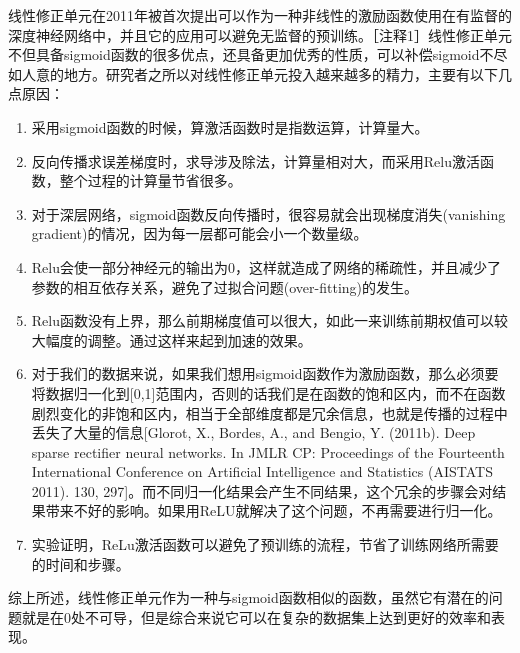 		线性修正单元在2011年被首次提出可以作为一种非线性的激励函数使用在有监督的深度神经网络中，并且它的应用可以避免无监督的预训练。［注释1］线性修正单元不但具备sigmoid函数的很多优点，还具备更加优秀的性质，可以补偿sigmoid不尽如人意的地方。研究者之所以对线性修正单元投入越来越多的精力，主要有以下几点原因：
		\begin{enumerate}
		\item 采用sigmoid函数的时候，算激活函数时是指数运算，计算量大。
		\item 反向传播求误差梯度时，求导涉及除法，计算量相对大，而采用Relu激活函数，整个过程的计算量节省很多。
		\item 对于深层网络，sigmoid函数反向传播时，很容易就会出现梯度消失(vanishing gradient)的情况，因为每一层都可能会小一个数量级。
		\item Relu会使一部分神经元的输出为0，这样就造成了网络的稀疏性，并且减少了参数的相互依存关系，避免了过拟合问题(over-fitting)的发生。
		\item Relu函数没有上界，那么前期梯度值可以很大，如此一来训练前期权值可以较大幅度的调整。通过这样来起到加速的效果。
		\item 对于我们的数据来说，如果我们想用sigmoid函数作为激励函数，那么必须要将数据归一化到[0,1]范围内，否则的话我们是在函数的饱和区内，而不在函数剧烈变化的非饱和区内，相当于全部维度都是冗余信息，也就是传播的过程中丢失了大量的信息[Glorot, X., Bordes, A., and Bengio, Y. (2011b). Deep sparse rectifier neural networks. In JMLR CP: Proceedings of the Fourteenth International Conference on Artificial Intelligence and Statistics (AISTATS 2011). 130, 297]。而不同归一化结果会产生不同结果，这个冗余的步骤会对结果带来不好的影响。如果用ReLU就解决了这个问题，不再需要进行归一化。
		\item 实验证明，ReLu激活函数可以避免了预训练的流程，节省了训练网络所需要的时间和步骤。
		
		\end{enumerate}
		
		综上所述，线性修正单元作为一种与sigmoid函数相似的函数，虽然它有潜在的问题就是在0处不可导，但是综合来说它可以在复杂的数据集上达到更好的效率和表现。
		